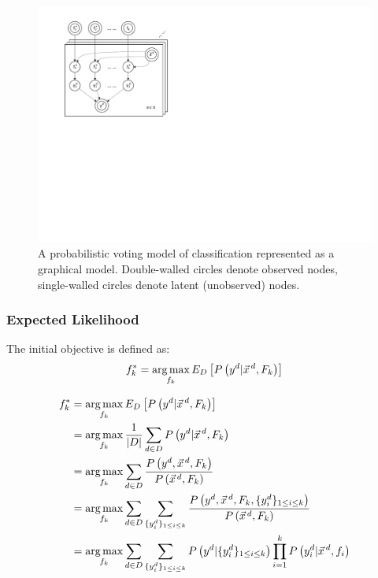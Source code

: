 \begin{figure}[tbp!]
	\centering
	\includegraphics[scale=0.9]{Plots_1.pdf}
	\caption{\footnotesize A probabilistic voting model of classification represented as a graphical model. 
Double-walled circles denote observed nodes, single-walled circles denote latent (unobserved) nodes.}
	\label{fig:model}
\end{figure}


\COMMENT
\subsubsection{Expected Likelihood}
The initial objective is defined as:
\[f_k^*=\argmax_{f_k}E_D\left[P\left(y^d|\vec{x}^{\,d},F_k\right)\right]\]

{\small
\begin{align}
f_k^*&=\argmax_{f_k}E_D\left[P\left(y^d|\vec{x}^{\,d},F_k\right)\right]\nonumber\\
&=\argmax_{f_k}\frac{1}{|D|}\sum_{d\in D} P\left(y^d | \vec{x}^{\,d},F_k\right)\nonumber\\
&=\argmax_{f_k}\sum_{d\in D}\frac{P\left(y^d,\vec{x}^{\,d},F_k\right)}{P\left(\vec{x}^{\,d},F_k\right)}\nonumber\\
&=\argmax_{f_k}\sum_{d\in D}\sum_{\{y_{i}^d\}_{1\leq i\leq k}}\frac{P\left(y^d,\vec{x}^{\,d},F_k,\{y_{i}^d\}_{1\leq i\leq k}\right)}{P\left(\vec{x}^{\,d},F_k\right)}\nonumber\\
&=\argmax_{f_k}\sum_{d\in D}\sum_{\{y_i^d\}_{1\leq i\leq k}}P\left(y^d|\{y^d_i\}_{1\leq i\leq k}\right)\prod_{i=1}^kP\left(y_i^d|\vec{x}^{\,d},f_i\right)\label{eq:expect}
\end{align}}

